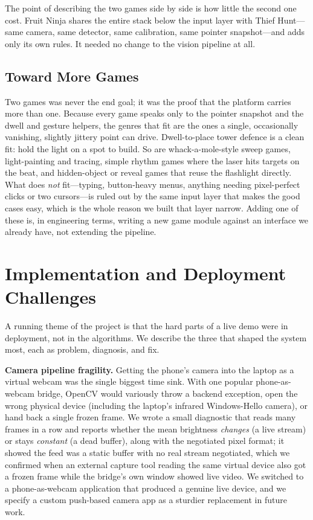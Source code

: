 \documentclass[conference]{IEEEtran}
\begin{document}
The point of describing the two games side by side is how little the second one
cost. Fruit Ninja shares the entire stack below the input layer with Thief
Hunt---same camera, same detector, same calibration, same pointer snapshot---and
adds only its own rules. It needed no change to the vision pipeline at all.

\subsection{Toward More Games}\label{sec:moregames}
Two games was never the end goal; it was the proof that the platform carries more
than one. Because every game speaks only to the pointer snapshot and the dwell and
gesture helpers, the genres that fit are the ones a single, occasionally vanishing,
slightly jittery point can drive. Dwell-to-place tower defence is a clean fit: hold
the light on a spot to build. So are whack-a-mole-style sweep games, light-painting
and tracing, simple rhythm games where the laser hits targets on the beat, and
hidden-object or reveal games that reuse the flashlight directly. What does
\emph{not} fit---typing, button-heavy menus, anything needing pixel-perfect
clicks or two cursors---is ruled out by the same input layer that makes the good
cases easy, which is the whole reason we built that layer narrow. Adding one of
these is, in engineering terms, writing a new game module against an interface we
already have, not extending the pipeline.

\section{Implementation and Deployment Challenges}\label{sec:challenges}
A running theme of the project is that the hard parts of a live demo were in
deployment, not in the algorithms. We describe the three that shaped the system
most, each as problem, diagnosis, and fix.

\noindent\textbf{Camera pipeline fragility.} Getting the phone's camera into the
laptop as a virtual webcam was the single biggest time sink. With one popular
phone-as-webcam bridge, OpenCV would variously throw a backend exception, open the
wrong physical device (including the laptop's infrared Windows-Hello camera), or
hand back a single frozen frame. We wrote a small diagnostic that reads many
frames in a row and reports whether the mean brightness \emph{changes} (a live
stream) or stays \emph{constant} (a dead buffer), along with the negotiated pixel
format; it showed the feed was a static buffer with no real stream negotiated,
which we confirmed when an external capture tool reading the same virtual device
also got a frozen frame while the bridge's own window showed live video. We
switched to a phone-as-webcam application that produced a genuine live device, and
we specify a custom push-based camera app as a sturdier replacement in future
work.
\end{document}
